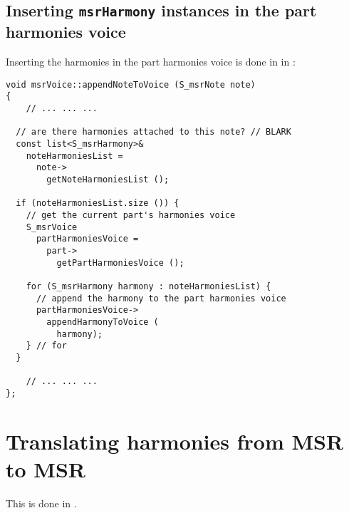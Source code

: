 \subsection{Inserting {\tt msrHarmony} instances in the part harmonies voice}

Inserting the harmonies in the part harmonies voice is done in  in :
\begin{lstlisting}[language=CPlusPlus]
void msrVoice::appendNoteToVoice (S_msrNote note)
{
	// ... ... ...

  // are there harmonies attached to this note? // BLARK
  const list<S_msrHarmony>&
    noteHarmoniesList =
      note->
        getNoteHarmoniesList ();

  if (noteHarmoniesList.size ()) {
    // get the current part's harmonies voice
    S_msrVoice
      partHarmoniesVoice =
        part->
          getPartHarmoniesVoice ();

    for (S_msrHarmony harmony : noteHarmoniesList) {
      // append the harmony to the part harmonies voice
      partHarmoniesVoice->
        appendHarmonyToVoice (
          harmony);
    } // for
  }

	// ... ... ...
};
\end{lstlisting}


\section{Translating harmonies from MSR to MSR}

This is done in \msrToMsr{}.

